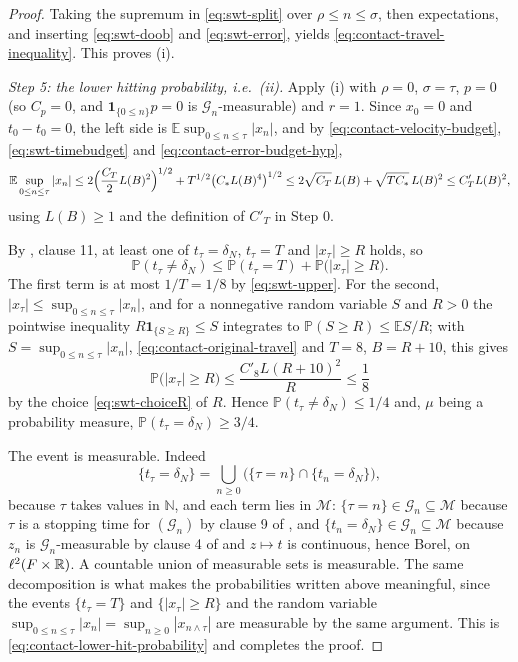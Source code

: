\begin{proof}
Taking the supremum in \eqref{eq:swt-split} over $\rho\le n\le\sigma$, then
expectations, and inserting \eqref{eq:swt-doob} and \eqref{eq:swt-error}, yields
\eqref{eq:contact-travel-inequality}. This proves (i).

\emph{Step 5: the lower hitting probability, i.e.\ (ii).}
Apply (i) with $\rho=0$, $\sigma=\tau$, $p=0$ (so $C_p=0$, and
$\mathbf1_{\{0\le n\}}p=0$ is $\mathcal G_n$-measurable) and $r=1$. Since
$x_0=0$ and $t_0-t_0=0$, the left side is
$\mathbb E\sup_{0\le n\le\tau}|x_n|$, and by
\eqref{eq:contact-velocity-budget}, \eqref{eq:swt-timebudget} and
\eqref{eq:contact-error-budget-hyp},
\begin{equation}\label{eq:contact-original-travel}
  \mathbb E\sup_{0\le n\le\tau}|x_n|
   \le2\Bigl(\frac{C_T}{2}L(B)^2\Bigr)^{1/2}
      +T^{1/2}\bigl(C_*L(B)^4\bigr)^{1/2}
   \le2\sqrt{C_T}\,L(B)+\sqrt{T C_*}\,L(B)^2
   \le C'_TL(B)^2,
\end{equation}
using $L(B)\ge1$ and the definition of $C'_T$ in Step 0.

By , clause 11, at least one of $t_\tau=\delta_N$,
$t_\tau=T$ and $|x_\tau|\ge R$ holds, so
\[
  \mathbb P(t_\tau\ne\delta_N)
   \le\mathbb P(t_\tau=T)+\mathbb P\bigl(|x_\tau|\ge R\bigr).
\]
The first term is at most $1/T=1/8$ by \eqref{eq:swt-upper}. For the second,
$|x_\tau|\le\sup_{0\le n\le\tau}|x_n|$, and for a nonnegative random variable
$S$ and $R>0$ the pointwise inequality
$R\mathbf1_{\{S\ge R\}}\le S$ integrates to
$\mathbb P(S\ge R)\le\mathbb E S/R$; with $S=\sup_{0\le n\le\tau}|x_n|$,
\eqref{eq:contact-original-travel} and $T=8$, $B=R+10$, this gives
\[
  \mathbb P\bigl(|x_\tau|\ge R\bigr)
   \le\frac{C'_8L(R+10)^2}{R}\le\frac18
\]
by the choice \eqref{eq:swt-choiceR} of $R$. Hence
$\mathbb P(t_\tau\ne\delta_N)\le1/4$ and, $\mu$ being a probability measure,
$\mathbb P(t_\tau=\delta_N)\ge3/4$.

The event is measurable. Indeed
\[
  \{t_\tau=\delta_N\}=\bigcup_{n\ge0}\bigl(\{\tau=n\}\cap\{t_n=\delta_N\}\bigr),
\]
because $\tau$ takes values in $\mathbb N$, and each term lies in $\mathcal M$:
$\{\tau=n\}\in\mathcal G_n\subseteq\mathcal M$ because $\tau$ is a stopping time
for $(\mathcal G_n)$ by clause 9 of , and
$\{t_n=\delta_N\}\in\mathcal G_n\subseteq\mathcal M$ because $z_n$ is
$\mathcal G_n$-measurable by clause 4 of  and
$z\mapsto t$ is continuous, hence Borel, on $\ell^2(F\times\mathbb{R})$. A countable
union of measurable sets is measurable. The same decomposition is what makes the
probabilities written above meaningful, since the events
$\{t_\tau=T\}$ and $\{|x_\tau|\ge R\}$ and the random variable
$\sup_{0\le n\le\tau}|x_n|=\sup_{n\ge0}|x_{n\wedge\tau}|$ are measurable by the
same argument. This is \eqref{eq:contact-lower-hit-probability} and completes
the proof.
\end{proof}
